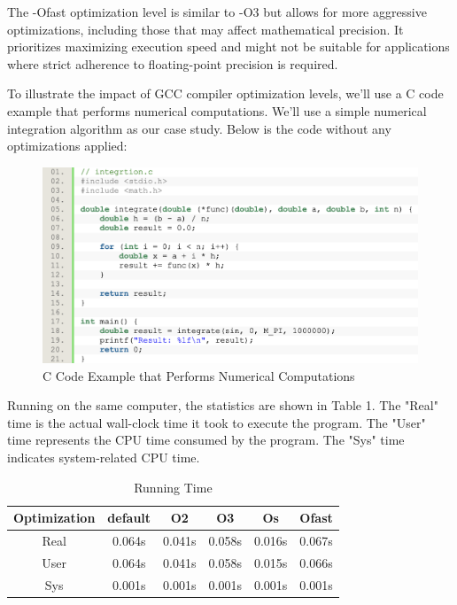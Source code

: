 \documentclass[conference]{IEEEtran}
\begin{document}
The -Ofast optimization level is similar to -O3 but allows for more aggressive optimizations, including those that may affect mathematical precision. It prioritizes maximizing execution speed and might not be suitable for applications where strict adherence to floating-point precision is required.

To illustrate the impact of GCC compiler optimization levels, we'll use a C code example that performs numerical computations. We'll use a simple numerical integration algorithm as our case study. Below is the code without any optimizations applied:

\begin{figure}[htbp]
\centering
\includegraphics [width=0.9\linewidth]{pictures/gcc_sample_code.png}
\caption{C Code Example that Performs Numerical Computations\cite{b3}}
\label{fig4}
\end{figure}

Running on the same computer, the statistics are shown in Table 1. The "Real" time is the actual wall-clock time it took to execute the program. The "User" time represents the CPU time consumed by the program. The "Sys" time indicates system-related CPU time.\cite{b3}

\begin{table}
	\caption{Running Time}
	\begin{center}
		\begin{tabular}{c c c c c c}
			\toprule
			Optimization &default&O2&O3&Os&Ofast\\
			\hline
			Real & 0.064s & 0.041s & 0.058s & 0.016s & 0.067s\\
			User & 0.064s & 0.041s & 0.058s & 0.015s & 0.066s\\
			Sys  & 0.001s & 0.001s & 0.001s & 0.001s & 0.001s\\
			\bottomrule
		\end{tabular}
	\end{center}
\end{table}
\end{document}
